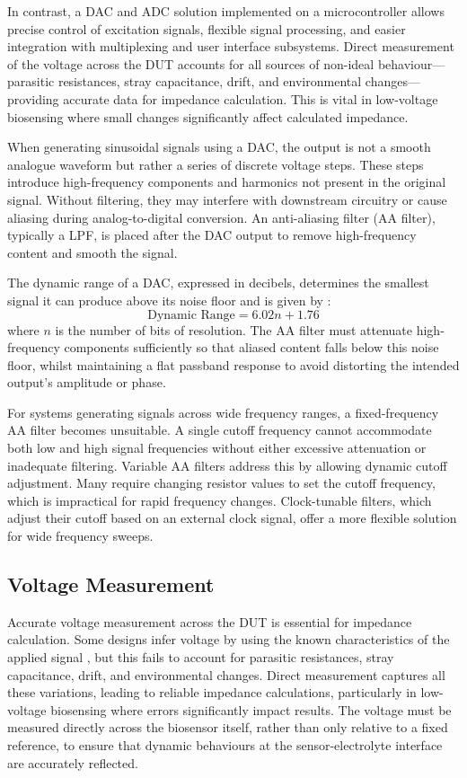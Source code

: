 In contrast, a \ac{DAC} and \ac{ADC} solution implemented on a microcontroller allows precise control of excitation signals, flexible signal processing, and easier integration with multiplexing and user interface subsystems. Direct measurement of the voltage across the \ac{DUT} accounts for all sources of non-ideal behaviour—parasitic resistances, stray capacitance, drift, and environmental changes—providing accurate data for impedance calculation. This is vital in low-voltage biosensing where small changes significantly affect calculated impedance.

When generating sinusoidal signals using a \ac{DAC}, the output is not a smooth analogue waveform but rather a series of discrete voltage steps. These steps introduce high-frequency components and harmonics not present in the original signal. Without filtering, they may interfere with downstream circuitry or cause aliasing during analog-to-digital conversion. An anti-aliasing filter (AA filter), typically a \ac{LPF}, is placed after the \ac{DAC} output to remove high-frequency content and smooth the signal.

The dynamic range of a \ac{DAC}, expressed in decibels, determines the smallest signal it can produce above its noise floor and is given by \cite{gaddyDYNAMICPERFORMANCETESTING}:
\begin{equation}
    \text{Dynamic Range} = 6.02n + 1.76 
    \label{eq:dac_range_lit}
\end{equation}
where $n$ is the number of bits of resolution. The AA filter must attenuate high-frequency components sufficiently so that aliased content falls below this noise floor, whilst maintaining a flat passband response to avoid distorting the intended output's amplitude or phase.

For systems generating signals across wide frequency ranges, a fixed-frequency AA filter becomes unsuitable. A single cutoff frequency cannot accommodate both low and high signal frequencies without either excessive attenuation or inadequate filtering. Variable AA filters address this by allowing dynamic cutoff adjustment. Many require changing resistor values to set the cutoff frequency, which is impractical for rapid frequency changes. Clock-tunable filters, which adjust their cutoff based on an external clock signal, offer a more flexible solution for wide frequency sweeps.

\subsection{Voltage Measurement}
Accurate voltage measurement across the \ac{DUT} is essential for impedance calculation. Some designs infer voltage by using the known characteristics of the applied signal \cite{buscagliaSimpleZLowCostPortable2023}, but this fails to account for parasitic resistances, stray capacitance, drift, and environmental changes. Direct measurement captures all these variations, leading to reliable impedance calculations, particularly in low-voltage biosensing where errors significantly impact results. The voltage must be measured directly across the biosensor itself, rather than only relative to a fixed reference, to ensure that dynamic behaviours at the sensor-electrolyte interface are accurately reflected.

